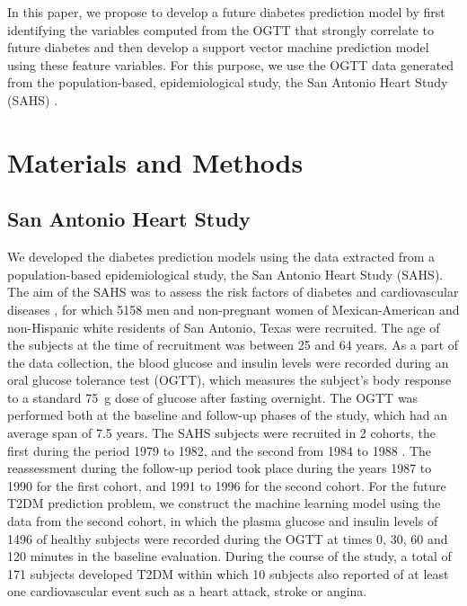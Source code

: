 \documentclass[journal,comsoc]{IEEEtran}
\renewcommand{\^}{\hat}  %
\begin{document}
In this paper, we propose to develop a future diabetes prediction model by first identifying the variables computed from the OGTT that strongly correlate to future diabetes and then develop a support vector machine prediction model using these feature variables. For this purpose, we use the OGTT data generated from the population-based, epidemiological study, the San Antonio Heart Study (SAHS) \cite{burke_rapid_1999, lorenzo_trend_2006}.
%
\section{Materials and Methods}
%
\subsection{San Antonio Heart Study}
%
We developed the diabetes prediction models using the data extracted from a population-based epidemiological study, the San Antonio Heart Study (SAHS). The aim of the SAHS was to assess the risk factors of diabetes and cardiovascular diseases \cite{burke_rapid_1999, lorenzo_trend_2006}, for which \num[group-minimum-digits=4, group-separator = {,}]{5158} men and non-pregnant women of Mexican-American and non-Hispanic white residents of San Antonio, Texas were recruited. The age of the subjects at the time of recruitment was between \num{25} and \num{64} years. As a part of the data collection, the blood glucose and insulin levels were recorded during an oral glucose tolerance test (OGTT), which measures the subject's body response to a standard \SI{75}{\gram} dose of glucose after fasting overnight. The OGTT was performed both at the baseline and follow-up phases of the study, which had an average span of \num{7.5} years. The SAHS subjects were recruited in \num{2} cohorts, the first during the period \num{1979} to \num{1982}, and the second from \num{1984} to \num{1988} \cite{haffner_hyperinsulinemia_1986}. The reassessment during the follow-up period took place during the years \num{1987} to \num{1990} for the first cohort, and \num{1991} to \num{1996} for the second cohort. For the future T2DM prediction problem, we construct the machine learning model using the data from the second cohort, in which the plasma glucose and insulin levels of \num[group-minimum-digits=4, group-separator = {,}]{1496} of healthy subjects were recorded during the OGTT at times \num{0}, \num{30}, \num{60} and \num{120} minutes in the baseline evaluation. During the course of the study, a total of \num{171} subjects developed T2DM within which \num{10} subjects also reported of at least one cardiovascular event such as a heart attack, stroke or angina.
\end{document}
